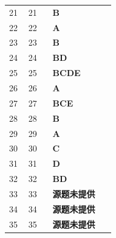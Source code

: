 \documentclass[UTF8,fontset=windows,11pt]{ctexart}
\begin{document}
\begin{longtable}{p{0.16\linewidth}p{0.2\linewidth}p{0.52\linewidth}}
21 & 21 & \textbf{\textcolor{answergreen}{B}} \\
22 & 22 & \textbf{\textcolor{answergreen}{A}} \\
23 & 23 & \textbf{\textcolor{answergreen}{B}} \\
24 & 24 & \textbf{\textcolor{answergreen}{BD}} \\
25 & 25 & \textbf{\textcolor{answergreen}{BCDE}} \\
26 & 26 & \textbf{\textcolor{answergreen}{A}} \\
27 & 27 & \textbf{\textcolor{answergreen}{BCE}} \\
28 & 28 & \textbf{\textcolor{answergreen}{B}} \\
29 & 29 & \textbf{\textcolor{answergreen}{A}} \\
30 & 30 & \textbf{\textcolor{answergreen}{C}} \\
31 & 31 & \textbf{\textcolor{answergreen}{D}} \\
32 & 32 & \textbf{\textcolor{answergreen}{BD}} \\
33 & 33 & \textbf{\textcolor{answergreen}{源题未提供}} \\
34 & 34 & \textbf{\textcolor{answergreen}{源题未提供}} \\
35 & 35 & \textbf{\textcolor{answergreen}{源题未提供}} \\
\end{longtable}
\vspace{0.4em}
\end{document}
